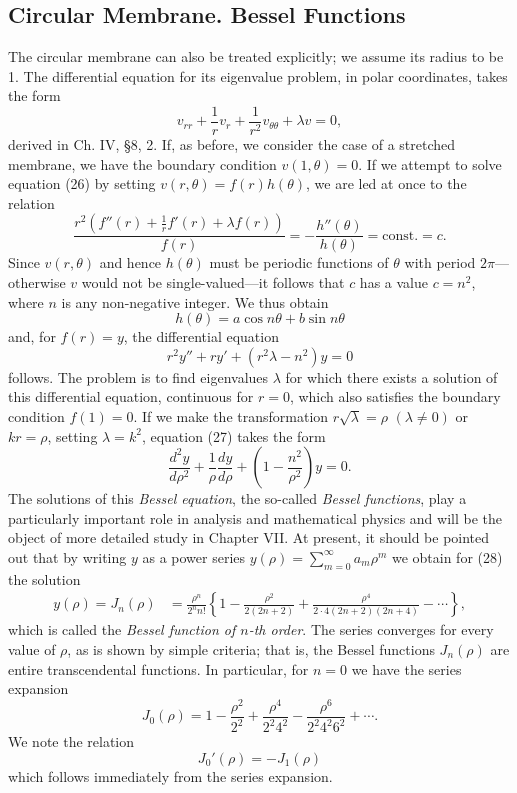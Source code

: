 \subsection{Circular Membrane. Bessel Functions}
The circular membrane can also be treated explicitly; we assume its radius to be 1. The differential equation for its eigenvalue problem, in polar coordinates, takes the form
\begin{equation}\tag{26}
v_{rr}+\frac1r v_r+\frac1{r^2}v_{\theta\theta}+\lambda v=0,
\end{equation}
derived in Ch. IV, \S8, 2. If, as before, we consider the case of a stretched membrane, we have the boundary condition $v(1,\theta)=0$. If we attempt to solve equation (26) by setting $v(r,\theta)=f(r)h(\theta)$, we are led at once to the relation
\[
\frac{r^2\left(f''(r)+\frac1rf'(r)+\lambda f(r)\right)}{f(r)}
=-\frac{h''(\theta)}{h(\theta)}=\mathrm{const.}=c.
\]
Since $v(r,\theta)$ and hence $h(\theta)$ must be periodic functions of $\theta$ with period $2\pi$---otherwise $v$ would not be single-valued---it follows that $c$ has a value $c=n^2$, where $n$ is any non-negative integer. We thus obtain
\[
h(\theta)=a\cos n\theta+b\sin n\theta
\]
and, for $f(r)=y$, the differential equation
\begin{equation}\tag{27}
r^2y''+ry'+(r^2\lambda-n^2)y=0
\end{equation}
follows. The problem is to find eigenvalues $\lambda$ for which there exists a solution of this differential equation, continuous for $r=0$, which also satisfies the boundary condition $f(1)=0$. If we make the transformation $r\sqrt\lambda=\rho$ $(\lambda\ne0)$ or $kr=\rho$, setting $\lambda=k^2$, equation (27) takes the form
\begin{equation}\tag{28}
\frac{d^2y}{d\rho^2}+\frac1\rho\frac{dy}{d\rho}+\left(1-\frac{n^2}{\rho^2}\right)y=0.
\end{equation}
The solutions of this \emph{Bessel equation}, the so-called \emph{Bessel functions}, play a particularly important role in analysis and mathematical physics and will be the object of more detailed study in Chapter VII. At present, it should be pointed out that by writing $y$ as a power series $y(\rho)=\sum_{m=0}^\infty a_m\rho^m$ we obtain for (28) the solution
\[
\begin{aligned}
y(\rho)=J_n(\rho)
&=\frac{\rho^n}{2^n n!}\left\{1-\frac{\rho^2}{2(2n+2)}
+\frac{\rho^4}{2\cdot4(2n+2)(2n+4)}-\cdots\right\},
\end{aligned}
\]
which is called the \emph{Bessel function of $n$-th order}. The series converges for every value of $\rho$, as is shown by simple criteria; that is, the Bessel functions $J_n(\rho)$ are entire transcendental functions. In particular, for $n=0$ we have the series expansion
\[
J_0(\rho)=1-\frac{\rho^2}{2^2}+\frac{\rho^4}{2^2 4^2}-\frac{\rho^6}{2^2 4^2 6^2}+\cdots.
\]
We note the relation
\begin{equation}\tag{29}
J_0'(\rho)=-J_1(\rho)
\end{equation}
which follows immediately from the series expansion.

